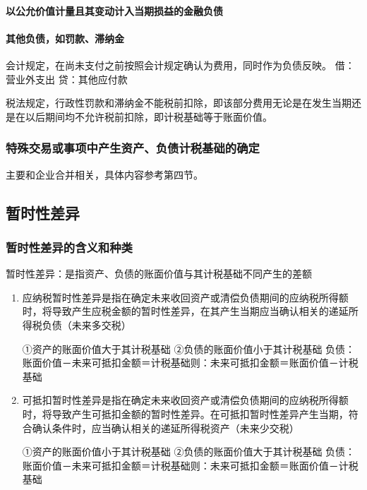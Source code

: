 \documentclass[UTF8,12pt]{ctexart}
\numberwithin{equation}{section} %
\numberwithin{figure}{section}
\numberwithin{table}{section}
\begin{document}
	\paragraph{以公允价值计量且其变动计入当期损益的金融负债}
	
	\paragraph{其他负债，如罚款、滞纳金}
	会计规定，在尚未支付之前按照会计规定确认为费用，同时作为负债反映。
	借：营业外支出
	贷：其他应付款
	
	税法规定，行政性罚款和滞纳金不能税前扣除，即该部分费用无论是在发生当期还是在以后期间均不允许税前扣除，即计税基础等于账面价值。
	
	
	\subsubsection{特殊交易或事项中产生资产、负债计税基础的确定}
	主要和企业合并相关，具体内容参考第四节。
	
	\subsection{暂时性差异}
	\subsubsection{暂时性差异的含义和种类}
	暂时性差异：是指资产、负债的账面价值与其计税基础不同产生的差额
	\begin{enumerate}
		\item 应纳税暂时性差异是指在确定未来收回资产或清偿负债期间的应纳税所得额时，将导致产生应税金额的暂时性差异，在其产生当期应当确认相关的递延所得税负债（未来多交税）
		
		①资产的账面价值大于其计税基础
		②负债的账面价值小于其计税基础
		负债：账面价值－未来可抵扣金额＝计税基础则：未来可抵扣金额＝账面价值－计税基础
		
		
		\item 可抵扣暂时性差异是指在确定未来收回资产或清偿负债期间的应纳税所得额时，将导致产生可抵扣金额的暂时性差异。在可抵扣暂时性差异产生当期，符合确认条件时，应当确认相关的递延所得税资产（未来少交税）
		
		①资产的账面价值小于其计税基础
		②负债的账面价值大于其计税基础
		负债：账面价值－未来可抵扣金额＝计税基础则：未来可抵扣金额＝账面价值－计税基础
		
	\end{enumerate}
\end{document}
